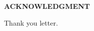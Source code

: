 \begin{centering}
\textbf{ACKNOWLEDGMENT}\\
\vspace{\baselineskip}
\end{centering}

Thank you letter.
